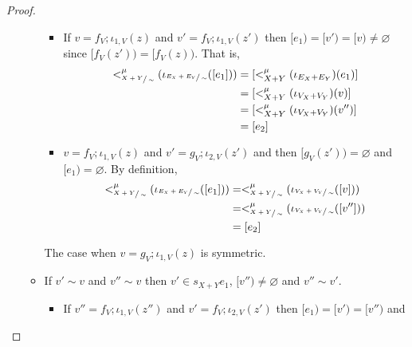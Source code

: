 \begin{proof}
\begin{itemize}
\begin{itemize}
                          \begin{itemize}
                            \item If $v = f_{V};\iota_{1,V}(z)$ and $v' = f_{V};\iota_{1,V}(z')$ then $[e_1) = [v') = [v) \not = \varnothing $ since $[f_{V}(z')) = [f_{V}(z))$.
                                  That is,
                                  \begin{align*}
                                    <_{\sfrac{X+Y}{\sim}}^{\mu}(\iota_{\sfrac{E_{X} + E_{Y}}{\sim}}([e_1])) &= [<_{X+Y}^{\mu}(\iota_{E_{X} + E_{Y}})(e_1)]\\
                                                                                                    &= [<_{X+Y}^{\mu}(\iota_{V_{X} + V_{Y}})(v)]\\
                                                                                                    &= [<_{X+Y}^{\mu}(\iota_{V_{X} + V_{Y}})(v'')]\\
                                                                                                    &= [e_2]
                                  \end{align*}
                            \item $v = f_{V};\iota_{1,V}(z)$ and $v' = g_{V};\iota_{2,V}(z')$ and then $[g_{V}(z')) = \varnothing$ and $[e_1) = \varnothing$.
                                  By definition,
                                  \begin{align*}
                                  <_{\sfrac{X+Y}{\sim}}^{\mu}(\iota_{\sfrac{E_{X} + E_{Y}}{\sim}}([e_1])) &= <_{\sfrac{X+Y}{\sim}}^{\mu}(\iota_{\sfrac{V_{X} + V_{Y}}{\sim}}([v]))\\
                                                                                                          &= <_{\sfrac{X+Y}{\sim}}^{\mu}(\iota_{\sfrac{V_{X} + V_{Y}}{\sim}}([v'']))\\
                                                                                                          &= [e_2]
                                  \end{align*}
                          \end{itemize}
                          The case when $v = g_{V};\iota_{1,V}(z)$ is symmetric.
                    \item If $v' \sim v$ and $v'' \sim v$ then $v' \in s_{X+Y}{e_1}$, $[v'') \not = \varnothing$ and $v'' \sim v'$.
                    \begin{itemize}
                        \item If $v'' = f_{V};\iota_{1,V}(z'')$ and $v' = f_{V};\iota_{2,V}(z')$ then $[e_1) = [v') = [v'')$ and

\end{itemize}
\end{itemize}
\end{itemize}
\end{proof}
